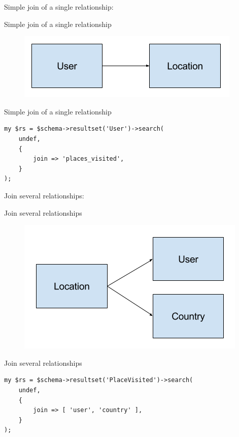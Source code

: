Simple join of a single relationship:

\begin{frame}[fragile]{Simple join of a single relationship}

\begin{figure}[!ht]
\centering
\includegraphics[width=1\linewidth]{img/join-simple.png}
\end{figure}

\end{frame}

\begin{frame}[fragile]{Simple join of a single relationship}

\begin{lstlisting}
my $rs = $schema->resultset('User')->search(
    undef,
    {
        join => 'places_visited',
    }
);
\end{lstlisting}
\end{frame}

Join several relationships:

\begin{frame}[fragile]{Join several relationships}
\begin{figure}[!ht]
\centering
\includegraphics[width=1\linewidth]{img/join-several.png}
\end{figure}
\end{frame}

\begin{frame}[fragile]{Join several relationships}

\begin{lstlisting}
my $rs = $schema->resultset('PlaceVisited')->search(
    undef,
    {
        join => [ 'user', 'country' ],
    }
);
\end{lstlisting}
\end{frame}

